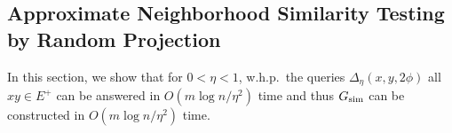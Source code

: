 








\subsection{Approximate Neighborhood Similarity Testing by Random Projection}
In this section, we show that for $0 < \eta < 1$, w.h.p.~the queries $\Delta_{\eta}(x,y,2\phi)$ all $xy \in E^{+}$ can be answered in $O(m\log n / \eta^2)$ time and thus $G_{\operatorname{sim}}$ can be constructed in $O(m\log n / \eta^2)$ time.

